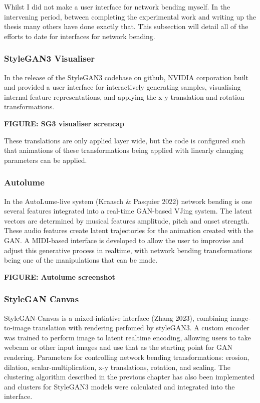 Whilst I did not make a user interface for network bending myself. 
In the intervening period, between completing the experimental work and writing up the thesis many others have done exactly that. 
This subsection will detail all of the efforts to date for interfaces for network bending.

\subsubsection{StyleGAN3 Visualiser}

In the release of the StyleGAN3 codebase on github, NVIDIA corporation built and provided a user interface for interactively generating samples, visualising internal feature representations, and applying the x-y translation and rotation transformations. 

\textbf{FIGURE: SG3 visualiser screncap}


These translations are only applied layer wide, but the code is configured such that animations of these transformations being applied with linearly changing parameters can be applied. 

\subsubsection{Autolume}

In the AutoLume-live system (Kraasch \& Pasquier 2022) network bending is one several features integrated into a real-time GAN-based VJing system. 
The latent vectors are determined by musical features amplitude, pitch and onset strength. 
These audio features create latent trajectories for the animation created with the GAN. 
A MIDI-based interface is developed to allow the user to improvise and adjust this generative process in realtime, with network bending transformations being one of the manipulations that can be made. 

\textbf{FIGURE: Autolume screenshot}

\subsubsection{StyleGAN Canvas}

StyleGAN-Canvas is a mixed-intiative interface (Zhang 2023), combining image-to-image translation with rendering perfomed by styleGAN3. 
A custom encoder was trained to perform image to latent realtime encoding, allowing users to take webcam or other input images and use that as the starting point for GAN rendering. 
Parameters for controlling network bending transformations:  erosion, dilation, scalar-multiplication, x-y translations, rotation, and scaling. 
The clustering algorithm described in the previous chapter has also been implemented and clusters for StyleGAN3 models were calculated and integrated into the interface.

